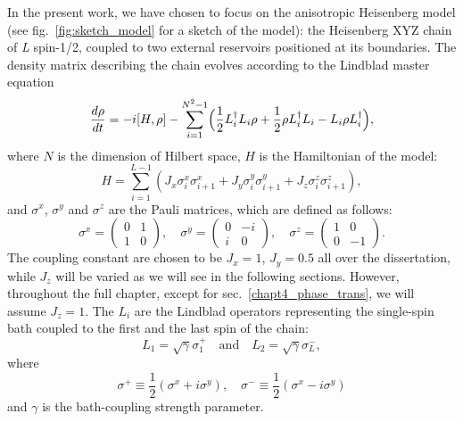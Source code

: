 In the present work, we have chosen to focus on the anisotropic Heisenberg model (see fig.~\ref{fig:sketch_model} for a sketch of the model): the Heisenberg XYZ chain of \textit{L} spin-1/2, coupled to two external reservoirs positioned at its boundaries. The density matrix describing the chain evolves according to the Lindblad master equation
\begin{equation}
    \frac{d\rho}{dt} = -i[H, \rho] - \sum_{i=1}^{N^2-1}\Bigl(\frac{1}{2}L_i^{\dagger}L_i\rho + \frac{1}{2}\rho L_i^{\dagger}L_i - L_i\rho L_i^{\dagger}\Bigl),
\end{equation}
where $N$ is the dimension of Hilbert space, $H$ is the Hamiltonian of the model:
\begin{equation}
\label{ham_chain}
    H = \sum_{i = 1}^{L-1} (J_x \sigma_i^x \sigma_{i+1}^x + J_y \sigma_i^y \sigma_{i+1}^y + J_z \sigma_i^z \sigma_{i+1}^z),
\end{equation}
and $\sigma^x$, $\sigma^y$ and $\sigma^z$ are the Pauli matrices, which are defined as follows:
\begin{equation}
\sigma^x = 
    \begin{pmatrix}
        0 & 1 \\
        1 & 0
    \end{pmatrix}
    , \quad \sigma^y = 
    \begin{pmatrix}
        0 & -i \\
        i & 0
    \end{pmatrix}
    , \quad \sigma^z = 
    \begin{pmatrix}
        1 & 0 \\
        0 & -1
    \end{pmatrix}
    .
\end{equation}
The coupling constant are chosen to be $J_x = 1$, $J_y = 0.5$ all over the dissertation, while $J_z$ will be varied as we will see in the following sections. However, throughout the full chapter, except for sec.~\ref{chapt4_phase_trans}, we will assume $J_z=1$.
The $L_i$ are the Lindblad operators representing the single-spin bath coupled to the first and the last spin of the chain:
\begin{equation}
\label{dissipators}
    L_1 = \sqrt{\gamma} \sigma_1^+ \quad \text{and} \quad L_2 =\sqrt{\gamma}\sigma_L^-,
\end{equation}
where 
\begin{equation*}
    \sigma^+ \equiv \frac{1}{2}(\sigma^x + i\sigma^y), \quad \sigma^- \equiv \frac{1}{2}(\sigma^x - i\sigma^y)
\end{equation*}
and $\gamma$ is the bath-coupling strength parameter.

